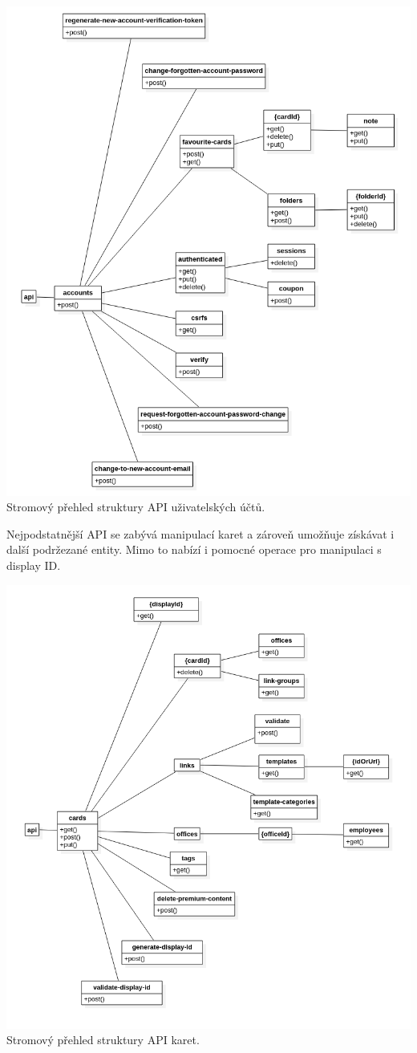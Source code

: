		\includegraphics{obrazky/api_model_ucty}\hfill
		Stromový přehled struktury API uživatelských účtů. %

		Nejpodstatnější \ac{API} se zabývá manipulací karet a zároveň umožňuje získávat i další podržezané entity.
		Mimo to nabízí i pomocné operace pro manipulaci s display ID.

		\includegraphics{obrazky/api_model_karty}\hfill
		Stromový přehled struktury API karet. %

